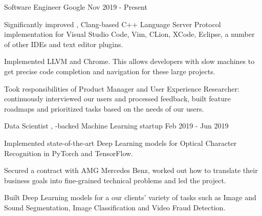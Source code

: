 
\begin{cventries}

  \cventry
    {Software Engineer}
    {Google}
    {}
    {Nov 2019 - Present}
    {
      \begin{cvitems}
        \item Significantly improved ,
          Clang-based C++ Language Server Protocol implementation for Visual
          Studio Code, Vim, CLion, XCode, Eclipse, a number of other IDEs and
          text editor plugins.
        \item Implemented 
          LLVM and Chrome. This allows developers with slow machines to get
          precise code completion and navigation for these large projects.
        \item Took responsibilities of Product Manager and User Experience
          Researcher: continuously interviewed our users and processed feedback,
          built feature roadmaps and prioritized tasks based on the needs of our
          users.
      \end{cvitems}
    }

  \cventry
    {Data Scientist}
    {,
     -backed Machine Learning
     startup}
    {}
    {Feb 2019 - Jun 2019}
    {
      \begin{cvitems}
        \item Implemented state-of-the-art Deep Learning models for Optical
          Character Recognition in PyTorch and TensorFlow.
        \item Secured a contract with AMG Mercedes Benz, worked out how to
          translate their business goals into fine-grained technical problems
          and led the project.
        \item Built Deep Learning models for a our clients' variety of tasks
          such as Image and Sound Segmentation, Image Classification and Video
          Fraud Detection.
      \end{cvitems}
    }


\end{cventries}
